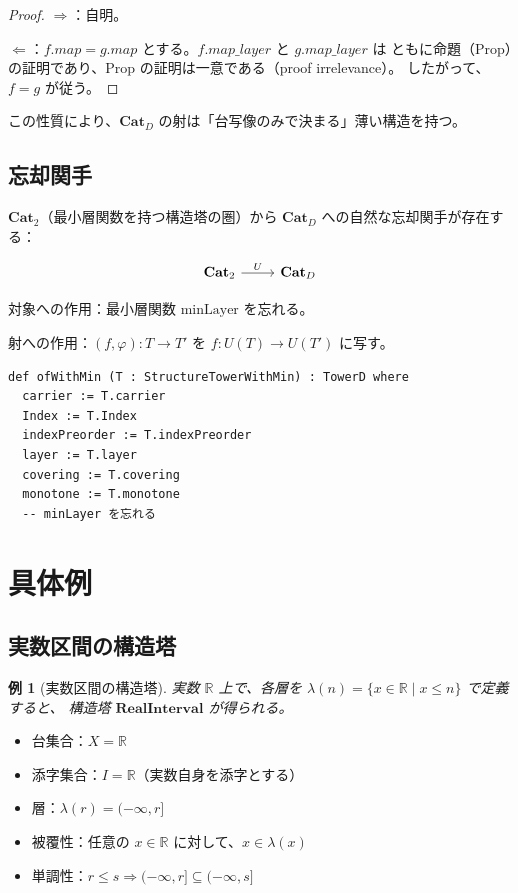 \documentclass[a4paper,12pt]{ltjsarticle}
\newtheorem{example}[theorem]{例}
\newcommand{\R}{\mathbb{R}}
\begin{document}
\begin{proof}
$\Rightarrow$：自明。

$\Leftarrow$：$f.map = g.map$ とする。$f.map\_layer$ と $g.map\_layer$ は
ともに命題（Prop）の証明であり、Prop の証明は一意である（proof irrelevance）。
したがって、$f = g$ が従う。
\end{proof}

この性質により、$\mathbf{Cat}_D$ の射は「台写像のみで決まる」薄い構造を持つ。

\subsection{忘却関手}

$\mathbf{Cat}_2$（最小層関数を持つ構造塔の圏）から $\mathbf{Cat}_D$ への自然な忘却関手が存在する：

\begin{equation*}
\begin{tikzcd}
\mathbf{Cat}_2 \arrow[r, "U"] & \mathbf{Cat}_D
\end{tikzcd}
\end{equation*}

対象への作用：最小層関数 $\text{minLayer}$ を忘れる。

射への作用：$(f, \varphi): T \to T'$ を $f: U(T) \to U(T')$ に写す。

\begin{verbatim}
def ofWithMin (T : StructureTowerWithMin) : TowerD where
  carrier := T.carrier
  Index := T.Index
  indexPreorder := T.indexPreorder
  layer := T.layer
  covering := T.covering
  monotone := T.monotone
  -- minLayer を忘れる
\end{verbatim}

\section{具体例}

\subsection{実数区間の構造塔}

\begin{example}[実数区間の構造塔]
\label{ex:real}
実数 $\R$ 上で、各層を $\lambda(n) = \{x \in \R \mid x \leq n\}$ で定義すると、
構造塔 $\mathbf{RealInterval}$ が得られる。
\end{example}

\begin{itemize}
  \item 台集合：$X = \R$
  \item 添字集合：$I = \R$（実数自身を添字とする）
  \item 層：$\lambda(r) = (-\infty, r]$
  \item 被覆性：任意の $x \in \R$ に対して、$x \in \lambda(x)$
  \item 単調性：$r \leq s \Rightarrow (-\infty, r] \subseteq (-\infty, s]$
\end{itemize}
\end{document}
